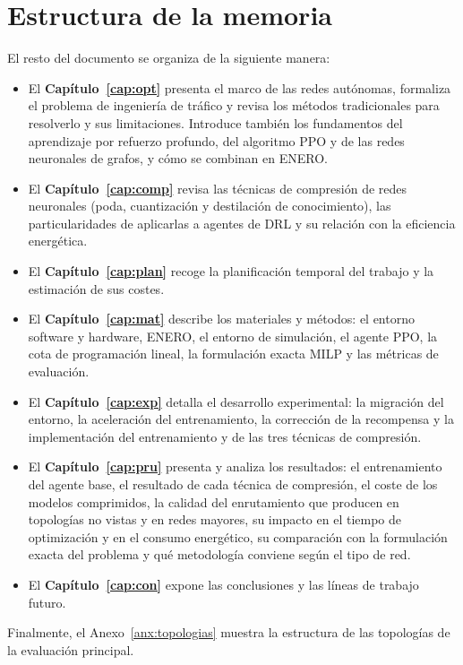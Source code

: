 \section{Estructura de la memoria}\label{sec:int_estructura}

El resto del documento se organiza de la siguiente manera:

\begin{itemize}
	\item El \textbf{Capítulo~\ref{cap:opt}} presenta el marco de las redes autónomas, formaliza el problema de ingeniería de tráfico y revisa los métodos tradicionales para resolverlo y sus limitaciones. Introduce también los fundamentos del aprendizaje por refuerzo profundo, del algoritmo PPO y de las redes neuronales de grafos, y cómo se combinan en ENERO.
	\item El \textbf{Capítulo~\ref{cap:comp}} revisa las técnicas de compresión de redes neuronales (poda, cuantización y destilación de conocimiento), las particularidades de aplicarlas a agentes de DRL y su relación con la eficiencia energética.
	\item El \textbf{Capítulo~\ref{cap:plan}} recoge la planificación temporal del trabajo y la estimación de sus costes.
	\item El \textbf{Capítulo~\ref{cap:mat}} describe los materiales y métodos: el entorno software y hardware, ENERO, el entorno de simulación, el agente PPO, la cota de programación lineal, la formulación exacta MILP y las métricas de evaluación.
	\item El \textbf{Capítulo~\ref{cap:exp}} detalla el desarrollo experimental: la migración del entorno, la aceleración del entrenamiento, la corrección de la recompensa y la implementación del entrenamiento y de las tres técnicas de compresión.
	\item El \textbf{Capítulo~\ref{cap:pru}} presenta y analiza los resultados: el entrenamiento del agente base, el resultado de cada técnica de compresión, el coste de los modelos comprimidos, la calidad del enrutamiento que producen en topologías no vistas y en redes mayores, su impacto en el tiempo de optimización y en el consumo energético, su comparación con la formulación exacta del problema y qué metodología conviene según el tipo de red.
	\item El \textbf{Capítulo~\ref{cap:con}} expone las conclusiones y las líneas de trabajo futuro.
\end{itemize}

Finalmente, el Anexo~\ref{anx:topologias} muestra la estructura de las topologías de la evaluación principal.
